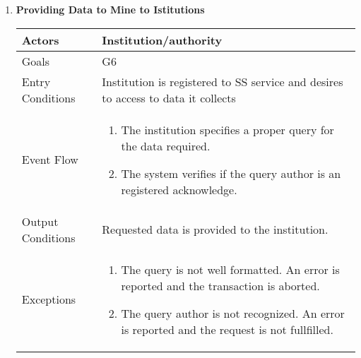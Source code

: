 \begin{enumerate}
	\item \textbf{Providing Data to Mine to Istitutions}
		\begin{table}[h!]
		\begin{tabular}{|l|p{}|}
		\hline
		Actors            			&       	Institution/authority\\ \hline
		Goals             			&         	G6\\ \hline
		Entry Conditions  	&  		Institution is registered to SS service and desires to access to data it collects\\ \hline
		Event Flow        		&          
				\begin{enumerate}[label=\alph*)]
					\item The institution specifies a proper query for the data required.
					\item The system verifies if the query author is an registered acknowledge.
					\end{enumerate}\\ \hline
		Output Conditions &    		Requested data is provided to the institution. \\ \hline
		Exceptions        		&
		       	\begin{enumerate}[label=\alph*)]
		       		\item The query is not well formatted. An error is reported and the transaction is aborted.
		       		\item The query author is not recognized. An error is reported and the request is not fullfilled. 
		       	\end{enumerate}\\ \hline
	\end{tabular}
	\end{table}
	
		\clearpage
	

\end{enumerate}
